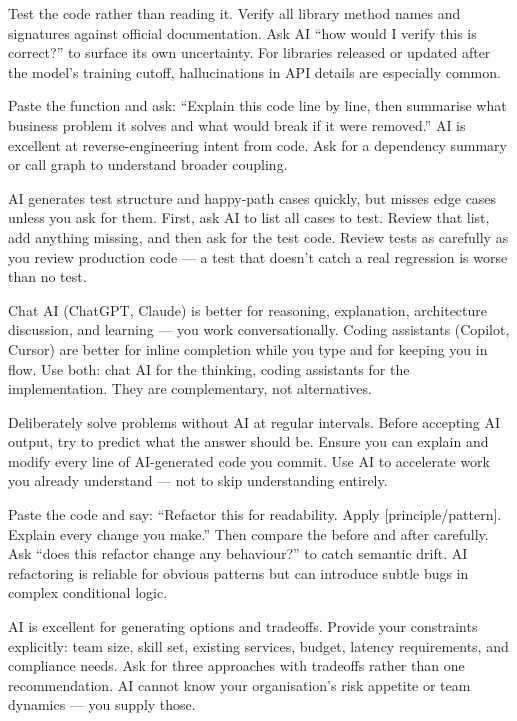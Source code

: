 {Test the code rather than reading it.
Verify all library method names and signatures against official documentation.
Ask AI ``how would I verify this is correct?'' to surface its own uncertainty.
For libraries released or updated after the model's training cutoff, hallucinations
in API details are especially common.}

{Paste the function and ask: ``Explain this code line by line, then summarise what
business problem it solves and what would break if it were removed.''
AI is excellent at reverse-engineering intent from code.
Ask for a dependency summary or call graph to understand broader coupling.}

{AI generates test structure and happy-path cases quickly, but misses edge cases
unless you ask for them.
First, ask AI to list all cases to test.
Review that list, add anything missing, and then ask for the test code.
Review tests as carefully as you review production code --- a test that doesn't
catch a real regression is worse than no test.}

{Chat AI (ChatGPT, Claude) is better for reasoning, explanation, architecture
discussion, and learning --- you work conversationally.
Coding assistants (Copilot, Cursor) are better for inline completion while you type
and for keeping you in flow.
Use both: chat AI for the thinking, coding assistants for the implementation.
They are complementary, not alternatives.}

{Deliberately solve problems without AI at regular intervals.
Before accepting AI output, try to predict what the answer should be.
Ensure you can explain and modify every line of AI-generated code you commit.
Use AI to accelerate work you already understand --- not to skip understanding
entirely.}

{Paste the code and say: ``Refactor this for readability. Apply [principle/pattern].
Explain every change you make.''
Then compare the before and after carefully.
Ask ``does this refactor change any behaviour?'' to catch semantic drift.
AI refactoring is reliable for obvious patterns but can introduce subtle bugs in
complex conditional logic.}

{AI is excellent for generating options and tradeoffs.
Provide your constraints explicitly: team size, skill set, existing services, budget,
latency requirements, and compliance needs.
Ask for three approaches with tradeoffs rather than one recommendation.
AI cannot know your organisation's risk appetite or team dynamics --- you supply those.}

